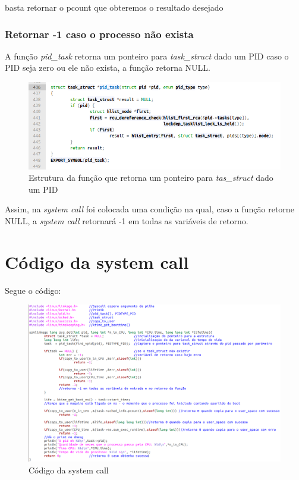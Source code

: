 \documentclass[12pt]{article}
\begin{document}
 	basta retornar o pcount que obteremos o resultado desejado
 \pagebreak
 
\subsubsection{Retornar -1 caso o processo não exista}
A função \textit{pid\_task} retorna um ponteiro para \textit{task\_struct} dado um PID caso o PID seja zero ou ele não exista, a função retorna NULL\cite{getpid}.

\begin{figure}[!htb]
	\centering
\includegraphics[scale=0.5]{imagens/pid.png} 
	\caption{Estrutura da função que retorna um ponteiro para \textit{tas\_struct} dado um PID}
\end{figure}

Assim, na \textit{system call} foi colocada uma condição na qual, caso a função retorne NULL, a \textit{system call} retornará -1 em todas as variáveis de retorno.
\pagebreak
\section{Código da system call}
	Segue o código:

\begin{figure}[!htb]
	\centering
\includegraphics[scale=0.5]{imagens/codsys.png} 
	\caption{Código da system call}
\end{figure}
	
\end{document}
